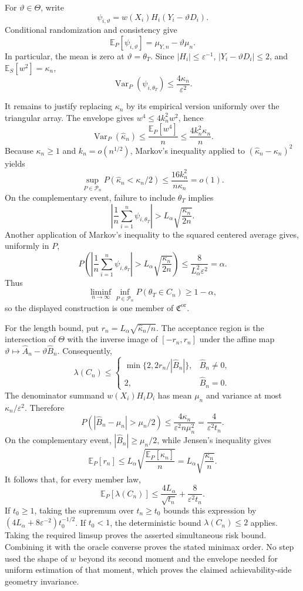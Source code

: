 For \(\vartheta\in\Theta\), write
\[
 \psi_{i,\vartheta}=w(X_i)H_i(Y_i-\vartheta D_i).
\]
Conditional randomization and consistency give
\[
 \mathbb E_P[\psi_{i,\vartheta}]
 =\mu_{Y,n}-\vartheta\mu_n.
\]
In particular, the mean is zero at \(\vartheta=\theta_T\).  Since \(|H_i|\le\varepsilon^{-1}\), \(|Y_i-\vartheta D_i|\le2\), and \(\mathbb E_S[w^2]=\kappa_n\),
\[
 \operatorname{Var}_P(\psi_{i,\theta_T})
 \le\frac{4\kappa_n}{\varepsilon^2}.
\]

It remains to justify replacing \(\kappa_n\) by its empirical version uniformly over the triangular array.  The envelope gives \(w^4\le4k_n^2w^2\), hence
\[
 \operatorname{Var}_P(\widehat\kappa_n)
 \le\frac{\mathbb E_P[w^4]}n
 \le\frac{4k_n^2\kappa_n}{n}.
\]
Because \(\kappa_n\ge1\) and \(k_n=o(n^{1/2})\), Markov's inequality applied to \((\widehat\kappa_n-\kappa_n)^2\) yields
\[
 \sup_{P\in\mathcal P_n}
 P(\widehat\kappa_n<\kappa_n/2)
 \le\frac{16k_n^2}{n\kappa_n}=o(1).
\]
On the complementary event, failure to include \(\theta_T\) implies
\[
 \left|\frac1n\sum_{i=1}^n\psi_{i,\theta_T}\right|
 >L_\alpha\sqrt{\frac{\kappa_n}{2n}}.
\]
Another application of Markov's inequality to the squared centered average gives, uniformly in \(P\),
\[
 P\left(
 \left|\frac1n\sum_{i=1}^n\psi_{i,\theta_T}\right|
 >L_\alpha\sqrt{\frac{\kappa_n}{2n}}
 \right)
 \le\frac{8}{L_\alpha^2\varepsilon^2}=\alpha.
\]
Thus
\[
 \liminf_{n\to\infty}\inf_{P\in\mathcal P_n}
 P(\theta_T\in C_n)\ge1-\alpha,
\]
so the displayed construction is one member of \(\mathfrak C^{\mathrm{or}}\).

For the length bound, put \(r_n=L_\alpha\sqrt{\widehat\kappa_n/n}\).  The acceptance region is the intersection of \(\Theta\) with the inverse image of \([-r_n,r_n]\) under the affine map \(\vartheta\mapsto\widehat A_n-\vartheta\widehat B_n\).  Consequently,
\[
 \lambda(C_n)\le
 \begin{cases}
 \min\{2,2r_n/|\widehat B_n|\},&\widehat B_n\ne0,\\
 2,&\widehat B_n=0.
 \end{cases}
\]
The denominator summand \(w(X_i)H_iD_i\) has mean \(\mu_n\) and variance at most \(\kappa_n/\varepsilon^2\).  Therefore
\[
 P\left(|\widehat B_n-\mu_n|>\mu_n/2\right)
 \le\frac{4\kappa_n}{\varepsilon^2n\mu_n^2}
 =\frac{4}{\varepsilon^2t_n}.
\]
On the complementary event, \(|\widehat B_n|\ge\mu_n/2\), while Jensen's inequality gives
\[
 \mathbb E_P[r_n]
 \le L_\alpha\sqrt{\frac{\mathbb E_P[\widehat\kappa_n]}n}
 =L_\alpha\sqrt{\frac{\kappa_n}{n}}.
\]
It follows that, for every member law,
\[
 \mathbb E_P[\lambda(C_n)]
 \le\frac{4L_\alpha}{\sqrt{t_n}}+\frac{8}{\varepsilon^2t_n}.
\]
If \(t_0\ge1\), taking the supremum over \(t_n\ge t_0\) bounds this expression by \((4L_\alpha+8\varepsilon^{-2})t_0^{-1/2}\).  If \(t_0<1\), the deterministic bound \(\lambda(C_n)\le2\) applies.  Taking the required limsup proves the asserted simultaneous risk bound.  Combining it with the oracle converse proves the stated minimax order.  No step used the shape of \(w\) beyond its second moment and the envelope needed for uniform estimation of that moment, which proves the claimed achievability-side geometry invariance.